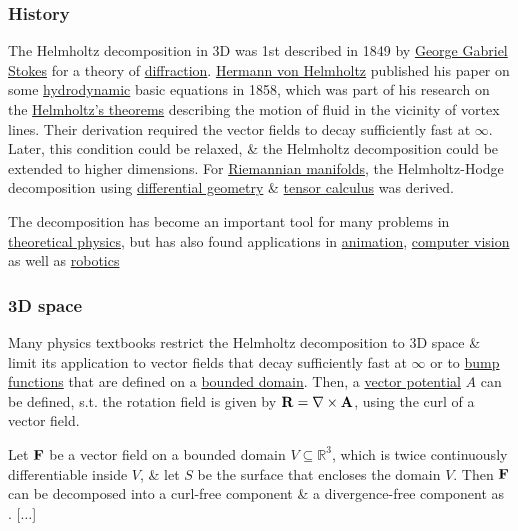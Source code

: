 \documentclass{article}
\begin{document}
\subsubsection{History}
The Helmholtz decomposition in 3D was 1st described in 1849 by \href{https://en.wikipedia.org/wiki/George_Gabriel_Stokes}{\sc George Gabriel Stokes} for a theory of \href{https://en.wikipedia.org/wiki/Diffraction}{diffraction}. \href{https://en.wikipedia.org/wiki/Hermann_von_Helmholtz}{\sc Hermann von Helmholtz} published his paper on some \href{https://en.wikipedia.org/wiki/Hydrodynamics}{hydrodynamic} basic equations in 1858, which was part of his research on the \href{https://en.wikipedia.org/wiki/Helmholtz%27s_theorems}{Helmholtz's theorems} describing the motion of fluid in the vicinity of vortex lines. Their derivation required the vector fields to decay sufficiently fast at $\infty$. Later, this condition could be relaxed, \& the Helmholtz decomposition could be extended to higher dimensions. For \href{https://en.wikipedia.org/wiki/Riemannian_manifold}{Riemannian manifolds}, the Helmholtz-Hodge decomposition using \href{https://en.wikipedia.org/wiki/Differential_geometry}{differential geometry} \& \href{https://en.wikipedia.org/wiki/Tensor_calculus}{tensor calculus} was derived.

The decomposition has become an important tool for many problems in \href{https://en.wikipedia.org/wiki/Theoretical_physics}{theoretical physics}, but has also found applications in \href{https://en.wikipedia.org/wiki/Animation}{animation}, \href{https://en.wikipedia.org/wiki/Computer_vision}{computer vision} as well as \href{https://en.wikipedia.org/wiki/Robotics}{robotics}

\subsubsection{3D space}
Many physics textbooks restrict the Helmholtz decomposition to 3D space \& limit its application to vector fields that decay sufficiently fast at $\infty$ or to \href{https://en.wikipedia.org/wiki/Bump_function}{bump functions} that are defined on a \href{https://en.wikipedia.org/wiki/Bounded_domain}{bounded domain}. Then, a \href{https://en.wikipedia.org/wiki/Vector_potential}{vector potential} $A$ can be defined, s.t. the rotation field is given by ${\bf R} = \nabla\times{\bf A}$, using the curl of a vector field.

Let ${\bf F}$ be a vector field on a bounded domain $V\subseteq\mathbb{R}^3$, which is twice continuously differentiable inside $V$, \& let $S$ be the surface that encloses the domain $V$. Then ${\bf F}$ can be decomposed into a curl-free component \& a divergence-free component as . [$\ldots$]
\end{document}
